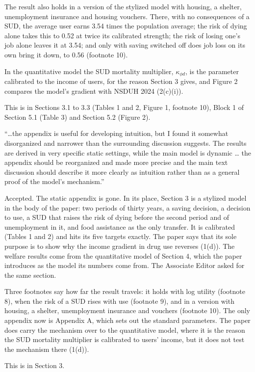 \documentclass[11pt]{article}
\begin{document}
\begin{response}
The result also holds in a version of the stylized model with housing, a
shelter, unemployment insurance and housing vouchers. There, with no consequences
of a SUD, the average user earns 3.54 times the population average; the risk of
dying alone takes this to 0.52 at twice its calibrated strength; the risk of
losing one's job alone leaves it at 3.54; and only with saving switched off does
job loss on its own bring it down, to 0.56 (footnote 10).

In the quantitative model the SUD mortality multiplier, $\kappa_{\phi d}$, is the
parameter calibrated to the income of users, for the reason Section 3 gives, and
Figure 2 compares the model's gradient with NSDUH 2024 (2(c)(i)).

This is in Sections 3.1 to 3.3 (Tables 1 and 2, Figure 1, footnote 10), Block 1
of Section 5.1 (Table 3) and Section 5.2 (Figure 2).
\end{response}

\begin{referee}
``\dots the appendix is useful for developing intuition, but I found it somewhat
disorganized and narrower than the surrounding discussion suggests. The results
are derived in very specific static settings, while the main model is dynamic \dots
the appendix should be reorganized and made more precise and the main text
discussion should describe it more clearly as intuition rather than as a general
proof of the model's mechanism.''
\end{referee}
\begin{response}
\concede Accepted. The static appendix is gone. In its place, Section 3 is a
stylized model in the body of the paper: two periods of thirty years, a saving
decision, a decision to use, a SUD that raises the risk of dying before the second
period and of unemployment in it, and food assistance as the only transfer. It is
calibrated (Tables 1 and 2) and hits its five targets exactly. The paper says
that its sole purpose is to show why the income gradient in drug use reverses
(1(d)). The welfare results come from the quantitative model of
Section 4, which the paper introduces as the model its numbers come from. The
Associate Editor asked for the same section.

Three footnotes say how far the result travels: it holds with log utility
(footnote 8), when the risk of a SUD rises with use (footnote 9), and in a
version with housing, a shelter, unemployment insurance and vouchers (footnote
10). The only appendix now is Appendix A, which sets out the standard parameters.
The paper does carry the mechanism over to the quantitative model, where it is
the reason the SUD mortality multiplier is calibrated to users' income, but it
does not test the mechanism there (1(d)).

This is in Section 3.
\end{response}
\end{document}
